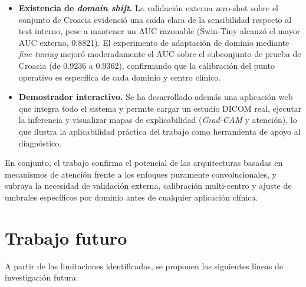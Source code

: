 \begin{itemize}
    \item \textbf{Existencia de \textit{domain shift}.} La validación externa zero-shot sobre el conjunto de Croacia evidenció una caída clara de la sensibilidad respecto al test interno, pese a mantener un AUC razonable (Swin-Tiny alcanzó el mayor AUC externo, 0.8821). El experimento de adaptación de dominio mediante \textit{fine-tuning} mejoró moderadamente el AUC sobre el subconjunto de prueba de Croacia (de 0.9236 a 0.9362), confirmando que la calibración del punto operativo es específica de cada dominio y centro clínico.

    \item \textbf{Demostrador interactivo.} Se ha desarrollado además una aplicación web que integra todo el sistema y permite cargar un estudio DICOM real, ejecutar la inferencia y visualizar mapas de explicabilidad (\textit{Grad-CAM} y atención), lo que ilustra la aplicabilidad práctica del trabajo como herramienta de apoyo al diagnóstico.
\end{itemize}

En conjunto, el trabajo confirma el potencial de las arquitecturas basadas en mecanismos de atención frente a los enfoques puramente convolucionales, y subraya la necesidad de validación externa, calibración multi-centro y ajuste de umbrales específicos por dominio antes de cualquier aplicación clínica.

\section{Trabajo futuro}

A partir de las limitaciones identificadas, se proponen las siguientes líneas de investigación futura:

